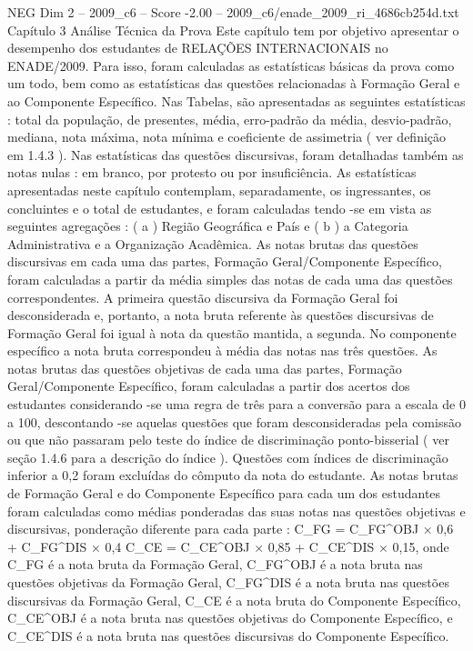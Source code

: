 \begin{textsample}{NEG Dim 2 – 2009\_c6 – Score -2.00 – 2009\_c6/enade\_2009\_ri\_4686cb254d.txt}  \label{ex:f2_neg_136}
Capítulo 3 Análise Técnica da Prova Este capítulo tem por objetivo apresentar o desempenho dos estudantes de RELAÇÕES INTERNACIONAIS no ENADE/2009.
Para isso, foram calculadas as estatísticas básicas da prova como um todo, bem como as estatísticas das questões relacionadas à Formação Geral e ao Componente Específico.
Nas Tabelas, são apresentadas as seguintes estatísticas : total da população, de presentes, média, erro-padrão da média, desvio-padrão, mediana, nota máxima, nota mínima e coeficiente de assimetria ( ver definição em 1.4.3 ).
Nas estatísticas das questões discursivas, foram detalhadas também as notas nulas : em branco, por protesto ou por insuficiência.
As estatísticas apresentadas neste capítulo contemplam, separadamente, os ingressantes, os concluintes e o total de estudantes, e foram calculadas tendo -se em vista as seguintes agregações : ( a ) Região Geográfica e País e ( b ) a Categoria Administrativa e a Organização Acadêmica.
As notas brutas das questões discursivas em cada uma das partes, Formação Geral/Componente Específico, foram calculadas a partir da média simples das notas de cada uma das questões correspondentes.
A primeira questão discursiva da Formação Geral foi desconsiderada e, portanto, a nota bruta referente às questões discursivas de Formação Geral foi igual à nota da questão mantida, a segunda.
No componente específico a nota bruta correspondeu à média das notas nas três questões.
As notas brutas das questões objetivas de cada uma das partes, Formação Geral/Componente Específico, foram calculadas a partir dos acertos dos estudantes considerando -se uma regra de três para a conversão para a escala de 0 a 100, descontando -se aquelas questões que foram desconsideradas pela comissão ou que não passaram pelo teste do índice de discriminação ponto-bisserial ( ver seção 1.4.6 para a descrição do índice ).
Questões com índices de discriminação inferior a 0,2 foram excluídas do cômputo da nota do estudante.
As notas brutas de Formação Geral e do Componente Específico para cada um dos estudantes foram calculadas como médias ponderadas das suas notas nas questões objetivas e discursivas, ponderação diferente para cada parte : C\_FG = C\_FG\textasciicircum{}OBJ × 0,6 + C\_FG\textasciicircum{}DIS × 0,4 C\_CE = C\_CE\textasciicircum{}OBJ × 0,85 + C\_CE\textasciicircum{}DIS × 0,15, onde C\_FG é a nota bruta da Formação Geral, C\_FG\textasciicircum{}OBJ é a nota bruta nas questões objetivas da Formação Geral, C\_FG\textasciicircum{}DIS é a nota bruta nas questões discursivas da Formação Geral, C\_CE é a nota bruta do Componente Específico, C\_CE\textasciicircum{}OBJ é a nota bruta nas questões objetivas do Componente Específico, e C\_CE\textasciicircum{}DIS é a nota bruta nas questões discursivas do Componente Específico.

\end{textsample}
